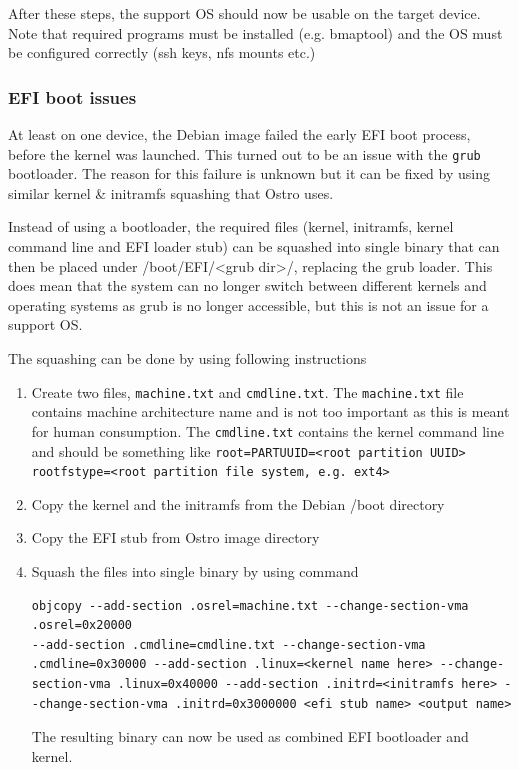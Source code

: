 \documentclass[a4paper,11pt]{article}
\newcommand{\cmd}[1]{\texttt{#1}}
\begin{document}
After these steps, the support OS should now be usable on the target device. Note that required programs must be installed (e.g. bmaptool) and the OS must be configured correctly (ssh keys, nfs mounts etc.)


\subsubsection*{EFI boot issues}

At least on one device, the Debian image failed the early EFI boot process, before the kernel was launched. This turned out to be an issue with the \cmd{grub} bootloader. The reason for this failure is unknown but it can be fixed by using similar kernel \& initramfs squashing that Ostro uses.

Instead of using a bootloader, the required files (kernel, initramfs, kernel command line and EFI loader stub) can be squashed into single binary that can then be placed under /boot/EFI/<grub dir>/, replacing the grub loader. This does mean that the system can no longer switch between different kernels and operating systems as grub is no longer accessible, but this is not an issue for a support OS.

The squashing can be done by using following instructions

\begin{enumerate}

\item Create two files, \cmd{machine.txt} and \cmd{cmdline.txt}. The \cmd{machine.txt} file contains machine architecture name and is not too important as this is meant for human consumption. The \cmd{cmdline.txt} contains the kernel command line and should be something like \cmd{root=PARTUUID=<root partition UUID> rootfstype=<root partition file system, e.g. ext4>}

\item Copy the kernel and the initramfs from the Debian /boot directory

\item Copy the EFI stub from Ostro image directory 

\item Squash the files into single binary by using command 

\begin{lstlisting}
objcopy --add-section .osrel=machine.txt --change-section-vma  .osrel=0x20000 
--add-section .cmdline=cmdline.txt --change-section-vma .cmdline=0x30000 --add-section .linux=<kernel name here> --change-section-vma .linux=0x40000 --add-section .initrd=<initramfs here> --change-section-vma .initrd=0x3000000 <efi stub name> <output name>

\end{lstlisting} 

The resulting binary can now be used as combined EFI bootloader and kernel.

\end{enumerate}
\end{document}

